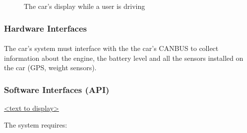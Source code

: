 \documentclass[english]{article}
\begin{document}
\begin{itemize}
\begin{figure}[H]
	\centering
	\caption{The car's display while a user is driving}
\end{figure}


\subsubsection{Hardware Interfaces}

\paragraph{}
The car's system must interface with the the car's CANBUS to collect information about the engine,
the battery level and all the sensors installed on the car (GPS, weight sensors).

\subsubsection{Software Interfaces (API)}\label{apis}

\href{<url>}{<text to display>}

The system requires:

\end{itemize}
\end{document}
